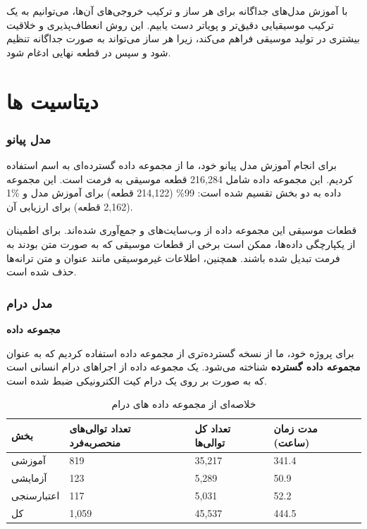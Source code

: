 با آموزش مدل‌های جداگانه برای هر ساز و ترکیب خروجی‌های آن‌ها، می‌توانیم به یک ترکیب موسیقیایی دقیق‌تر و پویا‌تر دست یابیم. این روش انعطاف‌پذیری و خلاقیت بیشتری در تولید موسیقی فراهم می‌کند، زیرا هر ساز می‌تواند به صورت جداگانه تنظیم شود و سپس در قطعه نهایی ادغام شود.

\section{دیتاسیت ها}
\subsubsection{مدل پیانو}

برای انجام آموزش مدل پیانو خود، ما از مجموعه داده گسترده‌ای به اسم   \cite{DBLP:conf/hcmir/WuLY023} استفاده کردیم. این مجموعه داده شامل 216,284 قطعه موسیقی به فرمت  است. این مجموعه داده به دو بخش تقسیم شده است: 99\% (214,122 قطعه) برای آموزش مدل و \%1 (2,162 قطعه) برای ارزیابی آن.

قطعات موسیقی این مجموعه داده از وب‌سایت‌های  و  جمع‌آوری شده‌اند. برای اطمینان از یکپارچگی داده‌ها، ممکن است برخی از قطعات موسیقی که به صورت متن بودند به فرمت  تبدیل شده باشند. همچنین، اطلاعات غیرموسیقی مانند عنوان و متن ترانه‌ها حذف شده است.
\subsubsection{مدل درام}
\textbf{مجموعه داده  \cite{callender2020improving}}

برای پروژه خود، ما از نسخه گسترده‌تری از مجموعه داده 
استفاده کردیم که به عنوان \textbf{مجموعه داده گسترده }
شناخته می‌شود.  یک مجموعه داده از اجراهای درام انسانی است که به صورت
 بر روی یک درام کیت الکترونیکی  ضبط شده است.

\begin{table}[!ht]
      \centering
      \begin{tabular}{|l|l|l|l|}
            \hline
            بخش        & تعداد توالی‌های منحصربه‌فرد & تعداد کل توالی‌ها & مدت زمان (ساعت) \\ \hline
            آموزشی     & 819                       & 35,217           & 341.4           \\ \hline
            آزمایشی    & 123                       & 5,289            & 50.9            \\ \hline
            اعتبارسنجی & 117                       & 5,031            & 52.2            \\ \hline
            کل         & 1,059                     & 45,537           & 444.5           \\ \hline
      \end{tabular}
      \caption{خلاصه‌ای از مجموعه داده های درام}
      \label{drumInfo}
\end{table}

